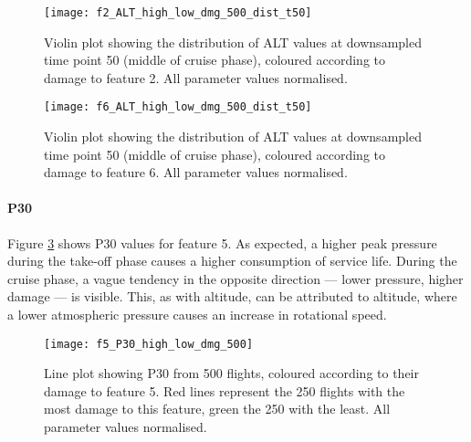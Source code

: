 \begin{figure}
    \centering
    \texttt{[image: f2\_ALT\_high\_low\_dmg\_500\_dist\_t50]}
    \caption{\label{fig:dmg_violin_ALT_f2} Violin plot showing the distribution of ALT values at downsampled time point 50 (middle of cruise phase), coloured according to damage to feature 2. All parameter values normalised.}
\end{figure}

\begin{figure}
    \centering
    \texttt{[image: f6\_ALT\_high\_low\_dmg\_500\_dist\_t50]}
    \caption{\label{fig:dmg_violin_ALT_f6} Violin plot showing the distribution of ALT values at downsampled time point 50 (middle of cruise phase), coloured according to damage to feature 6. All parameter values normalised.}
\end{figure}

\paragraph{P30}
Figure \ref{fig:high_low_dmg_P30} shows P30 values for feature 5. As expected, a higher peak pressure during the take-off phase causes a higher consumption of service life. During the cruise phase, a vague tendency in the opposite direction --- lower pressure, higher damage --- is visible. This, as with altitude, can be attributed to altitude, where a lower atmospheric pressure causes an increase in rotational speed.

\begin{figure}
    \centering
    \texttt{[image: f5\_P30\_high\_low\_dmg\_500]}
    \caption{\label{fig:high_low_dmg_P30} Line plot showing P30 from 500 flights, coloured according to their damage to feature 5. Red lines represent the 250 flights with the most damage to this feature, green the 250 with the least. All parameter values normalised.}
\end{figure}




